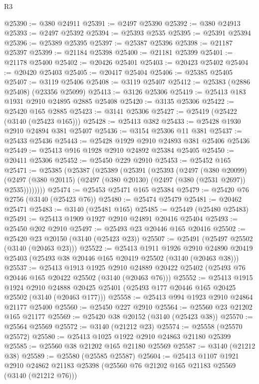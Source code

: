 \begin{lexlean}{R3}
\begin{coremodule}
@25390 := @380 @24911
@25391 := @2497 @25390
@25392 := @380 @24913
@25393 := @2497 @25392
@25394 := @25393 @2535
@25395 := @25391 @25394
@25396 := @25389 @25395
@25397 := @25387 @25396
@25398 := @21187 @25397
@25399 := @21184 @25398
@25400 := @21181 @25399
@25401 := @21178 @25400
@25402 := @20426 @25401
@25403 := @20423 @25402
@25404 := @20420 @25403
@25405 := @20417 @25404
@25406 := @25385 @25405
@25407 := @3119 @25406
@25408 := @3119 @25407
@25412 := @25383 (@2886 @25408) (@23356 @25099)
@25413 := @3126 @25306
@25419 := @25413 @183 @1931 @2910 @24895 @2885 @25408
@25420 := @3135 @25306
@25422 := @25420 @165 @2885
@25423 := @3141 @25306
@25427 := @25419 (@25422 (@3140 (@25423 @165)))
@25428 := @25413 @382
@25433 := @25428 @1930 @2910 @24894 @381 @25407
@25436 := @3154 @25306 @11 @381
@25437 := @25433 @25436
@25443 := @25428 @1929 @2910 @24893 @381 @25406 @25436
@25449 := @25413 @916 @1928 @2910 @24892 @25384 @25405
@25450 := @20411 @25306
@25452 := @25450 @229 @2910
@25453 := @25452 @165
@25471 := @25385
    (@25387
      (@25389
        (@25391
          (@25393
            (@2497
              (@380 @20099)
              (@2497 (@380 @20115) (@2497 (@380 @20130) (@2497 (@380 (@2531 @2697)) @2535))))))))
@25474 := @25453 @25471 @165 @25384
@25479 := @25420 @76 @2756 (@3140 (@25423 @76))
@25480 := @25474 @25479
@25481 := @20462 @25471
@25483 := @3140 (@25481 @165)
@25485 := @25449 (@25480 @25483)
@25491 := @25413 @1909 @1927 @2910 @24891 @20416 @25404
@25493 := @25450 @202 @2910
@25497 := @25493 @23 @20446 @165 @20416
@25502 := @25420 @23 @20150 (@3140 (@25423 @23))
@25507 := @25491 (@25497 @25502 (@3140 (@20463 @23)))
@25522 := @25413
    @1911
    @1926
    @2910
    @24890
    @20419
    @25403
    (@25493 @38 @20446 @165 @20419 @25502 (@3140 (@20463 @38)))
@25537 := @25413
    @1913
    @1925
    @2910
    @24889
    @20422
    @25402
    (@25493 @76 @20446 @165 @20422 @25502 (@3140 (@20463 @76)))
@25552 := @25413
    @1915
    @1924
    @2910
    @24888
    @20425
    @25401
    (@25493 @177 @20446 @165 @20425 @25502 (@3140 (@20463 @177)))
@25558 := @25413 @994 @1923 @2910 @24864 @21177 @25400
@25560 := @25450 @227 @2910
@25564 := @25560 @23 @21202 @165 @21177
@25569 := @25420 @38 @20152 (@3140 (@25423 @38))
@25570 := @25564 @25569
@25572 := @3140 (@21212 @23)
@25574 := @25558 (@25570 @25572)
@25580 := @25413 @1025 @1922 @2910 @24863 @21180 @25399
@25585 := @25560 @38 @21202 @165 @21180 @25569
@25587 := @3140 (@21212 @38)
@25589 := @25580 (@25585 @25587)
@25604 := @25413
    @1107
    @1921
    @2910
    @24862
    @21183
    @25398
    (@25560 @76 @21202 @165 @21183 @25569 (@3140 (@21212 @76)))

\end{coremodule}
\end{lexlean}
